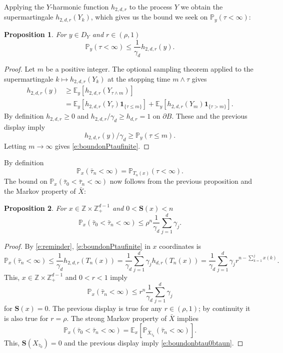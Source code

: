 \documentclass[11pt,a4paper]{article}
\newtheorem{proposition}{Proposition}[section]
\begin{document}
Applying the $Y$-harmonic function $h_{2,d,r}$ to the process $Y$
we obtain the supermartingale
$h_{2,d,r}(Y_k)$, which gives us the bound we seek
on ${\mathbb P}_y(\tau < \infty)$:
\begin{proposition}
For $y \in D_Y$ and $ r \in (\rho, 1)$
\begin{equation}\label{e:boundonPtaufinite}
{\mathbb P}_y(\tau < \infty) \le\frac{1}{\gamma_d} h_{2,d,r}(y).
\end{equation}
\end{proposition}
\begin{proof}
Let $m$ be a positive integer.
The optional sampling theorem applied to the supermartingale
$k \mapsto h_{2,d,r}(Y_k)$ at the stopping time $m \wedge \tau$ gives
\begin{align*}
h_{2,d,r}(y) &\ge {\mathbb E}_{y}[ h_{2,d,r}(Y_{\tau \wedge m})]\\
&= {\mathbb E}_{y}[ h_{2,d,r}(Y_{\tau}){\bm 1}_{\{\tau \le m \}}]
 +{\mathbb E}_{y}[ h_{2,d,r}(Y_m){\bm 1}_{\{\tau >m \}}].
\end{align*}
By definition $h_{2,d,r} \ge 0$ and 
$h_{2,d,r}/\gamma_d \ge h_{d,r} = 1$ on $\partial B.$ These
and the previous display imply
\[
h_{2,d,r}(y)/\gamma_d \ge {\mathbb P}_{y}(\tau \le m ).
\]
Letting $m \rightarrow \infty$ gives \eqref{e:boundonPtaufinite}.
\end{proof}
By definition
\begin{equation}\label{e:reminder}
{\mathbb P}_x(\bar\tau_n < \infty) = 
{\mathbb P}_{T_n(x)}(\tau < \infty).
\end{equation}
The bound on ${\mathbb P}_x(\bar\tau_0 < \bar\tau_n < \infty)$ now
follows from the previous proposition and the Markov property of
$\bar{X}$:
\begin{proposition}\label{p:boundonbtau0btaun}
For $x \in {\mathbb Z} \times {\mathbb Z}_+^{d-1}$ and $ 0 < {\bm S}(x) < n$
\begin{equation}\label{e:boundonbtau0btaun}
{\mathbb P}_x(\bar\tau_0 < \bar\tau_n < \infty) \le 
\rho^n \frac{1}{\gamma_d} \sum_{j=1}^d \gamma_j.
\end{equation}
\end{proposition}
\begin{proof}
By \eqref{e:reminder}, \eqref{e:boundonPtaufinite} in $x$ coordinates
is
\[
{\mathbb P}_x(\bar\tau_n < \infty) \le 
\frac{1}{\gamma_d}h_{2,d,r}(T_n(x))= 
\frac{1}{\gamma_d}\sum_{j=1}^d \gamma_j h_{d,r}(T_n(x)) = 
\frac{1}{\gamma_d}\sum_{j=1}^d \gamma_j 
r^{n- \sum_{k=1}^{j} x(k)}.
\]
This, $x \in {\mathbb Z} \times {\mathbb Z}_+^{d-1}$ and $0 < r < 1$ imply
\[
{\mathbb P}_x(\bar\tau_n < \infty) \le r^{n}\frac{1}{\gamma_d} \sum_{j=1}^d \gamma_j
\]
for ${\bm S}(x) = 0.$ The previous display is true for any $r \in (\rho,1)$;
by continuity it is also true for $r=\rho.$
The strong Markov property of $\bar{X}$ implies
\[
{\mathbb P}_x(\bar\tau_0 < \bar\tau_n < \infty) =
{\mathbb E}_{x}\left[{\mathbb P}_{\bar{X}_{\bar\tau_0}}( \bar\tau_n < \infty)\right].
\]
This, ${\bm S}(X_{\bar\tau_0}) = 0$ 
and the previous display imply \eqref{e:boundonbtau0btaun}.
\end{proof}
\end{document}
